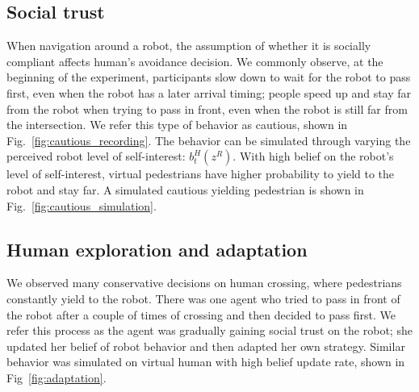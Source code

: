 \documentclass[letterpaper, 10 pt, conference]{ieeeconf}  %
\begin{document}
\subsection{Social trust}
When navigation around a robot, the assumption of whether it is socially 
compliant affects human's avoidance decision. We commonly observe, at the 
beginning of the experiment, participants slow down to wait for the robot to 
pass first, even when the robot has a later arrival 
timing; people speed up and stay far from the robot when trying to pass in 
front, even when the robot is still far from the intersection. We refer this 
type of behavior as cautious, shown in 
Fig.~\ref{fig:cautious_recording}. The behavior can be simulated through 
varying the perceived robot level of 
self-interest: $b^H_t(z^R)$. With high belief on the robot's level of 
self-interest, virtual pedestrians have higher probability to yield to the 
robot and stay far. A simulated cautious yielding pedestrian is shown in Fig.~\ref{fig:cautious_simulation}.

\subsection{Human exploration and adaptation}
We observed many conservative decisions on human crossing, where 
pedestrians constantly yield to the robot. 
There was one agent who tried to pass in front of the 
robot after a couple of times of crossing and then decided to pass first. We 
refer this process as the agent was gradually gaining social trust on the 
robot; she updated her belief of robot behavior and then adapted her own 
strategy. Similar behavior was simulated on virtual human with high belief 
update rate, shown in Fig~\ref{fig:adaptation}.   



\end{document}
